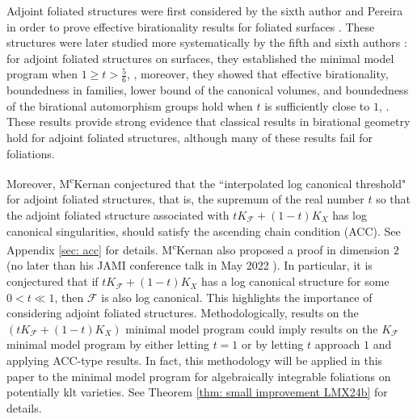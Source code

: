 \documentclass[12pt]{amsart}
\numberwithin{equation}{section}
\newcommand{\Ff}{\mathcal{F}}
\theoremstyle{definition}
\theoremstyle{definition}
\theoremstyle{definition}
\begin{document}

\medskip

Adjoint foliated structures were first considered by the sixth author and Pereira in order to prove effective birationality results for foliated surfaces \cite{PS19}.
These structures were later studied more systematically by the fifth and sixth authors \cite{SS23}: 
for adjoint foliated structures on surfaces, they established the minimal model program when 
$1\geq t>\frac{5}{6}$, \cite[Theorems 1.1 and 1.2]{SS23}, 
moreover, they showed that effective birationality, boundedness in families, lower bound of the canonical volumes, and boundedness of the birational automorphism groups hold when 
$t$ is sufficiently close to $1$, \cite[Theorems 1.3-1.7]{SS23}. These results provide strong evidence that classical results in birational geometry hold for adjoint foliated structures, although many of these results fail for foliations.

Moreover, M\textsuperscript{c}Kernan conjectured that the ``interpolated log canonical threshold" for adjoint foliated structures, that is, the supremum of the real number $t$ so that the adjoint foliated structure associated with $tK_{\Ff}+(1-t)K_X$ has log canonical singularities, should satisfy the ascending chain condition (ACC). See Appendix \ref{sec: acc} for details. M\textsuperscript{c}Kernan also proposed a proof in dimension $2$ (no later than his JAMI conference talk in May 2022 \cite{McK22}). In particular, it is conjectured that if $tK_{\Ff}+(1-t)K_X$ has a log canonical structure for some $0<t\ll 1$, then $\Ff$ is also log canonical. This highlights the importance of considering adjoint foliated structures. Methodologically, results on the $(tK_{\Ff}+(1-t)K_X)$ minimal model program could imply results on the $K_{\Ff}$ minimal model program by either letting $t=1$ or by letting $t$ approach $1$ and applying ACC-type results. In fact, this methodology will be applied in this paper to the minimal model program for algebraically integrable foliations on potentially klt varieties. See Theorem \ref{thm: small improvement LMX24b} for details.
\end{document}
